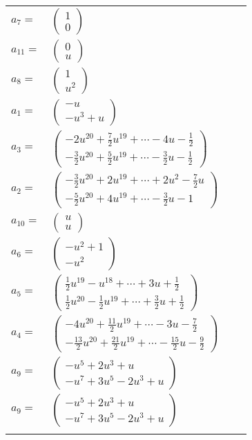 \documentclass[1p]{elsarticle_modified}
\theoremstyle{definition}
\begin{document}
\begin{tabular}{m{7pt} m{180pt} m{7pt} m{180pt} }
\flushright $a_{7}=$&$\begin{pmatrix}1\\0\end{pmatrix}$ \\
\flushright $a_{11}=$&$\begin{pmatrix}0\\u\end{pmatrix}$ \\
\flushright $a_{8}=$&$\begin{pmatrix}1\\u^2\end{pmatrix}$ \\
\flushright $a_{1}=$&$\begin{pmatrix}- u\\- u^3+u\end{pmatrix}$ \\
\flushright $a_{3}=$&$\begin{pmatrix}-2 u^{20}+\frac{7}{2} u^{19}+\cdots-4 u-\frac{1}{2}\\-\frac{3}{2} u^{20}+\frac{5}{2} u^{19}+\cdots-\frac{3}{2} u-\frac{1}{2}\end{pmatrix}$ \\
\flushright $a_{2}=$&$\begin{pmatrix}-\frac{3}{2} u^{20}+2 u^{19}+\cdots+2 u^2-\frac{7}{2} u\\-\frac{5}{2} u^{20}+4 u^{19}+\cdots-\frac{3}{2} u-1\end{pmatrix}$ \\
\flushright $a_{10}=$&$\begin{pmatrix}u\\u\end{pmatrix}$ \\
\flushright $a_{6}=$&$\begin{pmatrix}- u^2+1\\- u^2\end{pmatrix}$ \\
\flushright $a_{5}=$&$\begin{pmatrix}\frac{1}{2} u^{19}- u^{18}+\cdots+3 u+\frac{1}{2}\\\frac{1}{2} u^{20}-\frac{1}{2} u^{19}+\cdots+\frac{3}{2} u+\frac{1}{2}\end{pmatrix}$ \\
\flushright $a_{4}=$&$\begin{pmatrix}-4 u^{20}+\frac{11}{2} u^{19}+\cdots-3 u-\frac{7}{2}\\-\frac{13}{2} u^{20}+\frac{21}{2} u^{19}+\cdots-\frac{15}{2} u-\frac{9}{2}\end{pmatrix}$ \\
\flushright $a_{9}=$&$\begin{pmatrix}- u^5+2 u^3+u\\- u^7+3 u^5-2 u^3+u\end{pmatrix}$\\ \flushright $a_{9}=$&$\begin{pmatrix}- u^5+2 u^3+u\\- u^7+3 u^5-2 u^3+u\end{pmatrix}$\\&\end{tabular}
\end{document}
